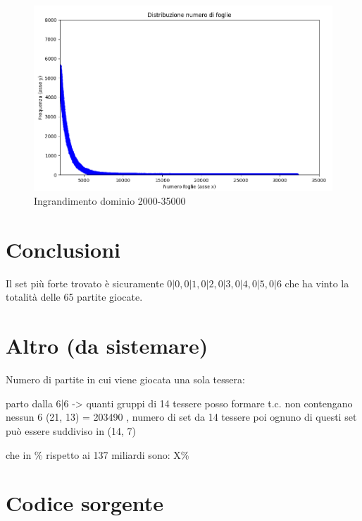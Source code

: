 \documentclass[a4paper,12pt]{report} %
\begin{document}
\begin{figure}[h!]
    \centering
    \includegraphics[width=1\textwidth]{imgs/grafico_2000_35000.png} %
    \caption{Ingrandimento dominio 2000-35000}
    \label{fig:etichetta}
\end{figure}




\chapter{Conclusioni}

Il set più forte trovato è sicuramente \(0|0, 0|1, 0|2, 0|3, 0|4, 0|5, 0|6\) che ha vinto la totalità delle 65 partite giocate.

\chapter{Altro (da sistemare)}

Numero di partite in cui viene giocata una sola tessera:

parto dalla 6|6 -> quanti gruppi di 14 tessere posso formare t.c. non contengano nessun 6
(21, 13) = 203490 , numero di set da 14 tessere
poi ognuno di questi set può essere suddiviso in (14, 7)

che in \% rispetto ai 137 miliardi sono: X\%




\appendix
\chapter{Codice sorgente}

\end{document}

